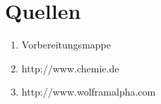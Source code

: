 \documentclass[a4paper,ngerman]{scrartcl}
\begin{document}
\clearpage
\section{Quellen}
\begin{enumerate}
\item Vorbereitungsmappe \label{ref:mappe}
\item http://www.chemie.de \label{ref:chemie.de}
\item http://www.wolframalpha.com \label{ref:wolfram}
\end{enumerate}
\end{document}
